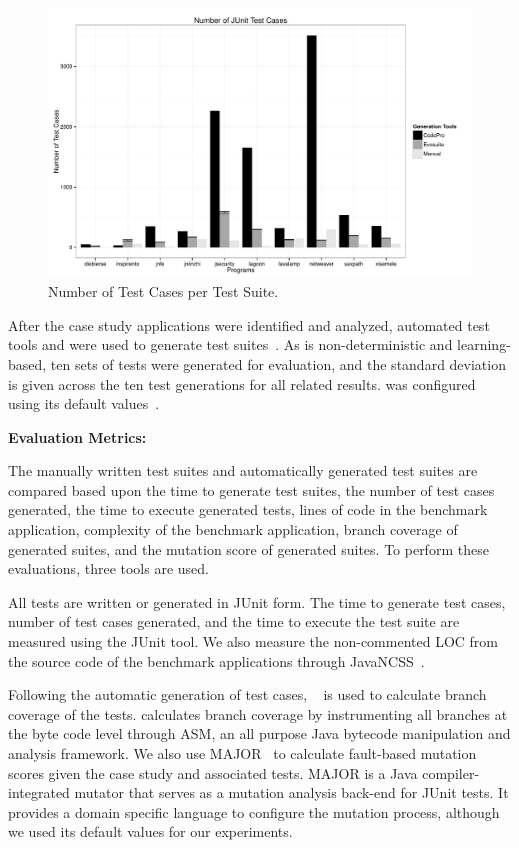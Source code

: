\begin{figure}[!t]
\centering
  \includegraphics[scale=0.5]{RGraphs/TestCasesGenerated.pdf}
    \caption{Number of Test Cases per Test Suite.}
  \label{fig:NumTests}
\end{figure}

After the case study applications were identified and analyzed, automated test tools \evo and \codepro were used to generate test suites~\cite{CodePro1, fraser:2011:eat:2025113.2025179}. As \evo is non-deterministic and learning-based, ten sets of tests were generated for evaluation, and the standard deviation is given across the ten test generations for all \evo related results.  \evo was configured using its default values~\cite{arcuri2013}.

\noindent \textbf{Evaluation Metrics:}

The manually written test suites and automatically generated test suites are compared based upon the time to generate test suites, the number of test cases generated, the time to execute generated tests, lines of code in the benchmark application, complexity of the benchmark application, branch coverage of generated suites, and the mutation score of generated suites. To perform these evaluations, three tools are used.

All tests are written or generated in JUnit form.  The time to generate test cases, number of test cases generated, and the time to execute the test suite are measured using the JUnit tool.  We also measure the non-commented LOC from the source code of the benchmark applications through JavaNCSS~\cite{leejavancss}.  

Following the automatic generation of test cases, \jacoco~\cite{jacoco} is used to calculate branch coverage of the tests.  \jacoco calculates branch coverage by instrumenting all branches at the byte code level through ASM, an all purpose Java bytecode manipulation and analysis framework. We also use MAJOR~\cite{just2011} to calculate fault-based mutation scores given the case study and associated tests. MAJOR is a Java compiler-integrated mutator that serves as a mutation analysis back-end for JUnit tests.  It provides a domain specific language to configure the mutation process, although we used its default values for our experiments.

